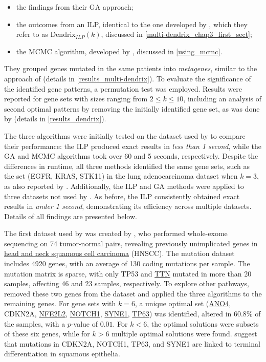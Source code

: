 \begin{itemize}
    \item the findings from their GA approach;
    \item the outcomes from an ILP, identical to the one developed by \textcite{multi-dendrix}, which they refer to as $\mathrm{Dendrix}_{\mathrm{\textit{ILP}}}(k)$, discussed in \cref{multi-dendrix_chap3_first_sect};
    \item the MCMC algorithm, developed by \textcite{dendrix}, discussed in \cref{using_mcmc}.
\end{itemize}

They grouped genes mutated in the same patients into \textit{metagenes}, similar to the approach of \textcite{multi-dendrix} (details in \cref{results_multi-dendrix}). To evaluate the significance of the identified gene patterns, a permutation test was employed. Results were reported for gene sets with sizes ranging from $2 \le k \le 10$, including an analysis of second optimal patterns by removing the initially identified gene set, as was done by \textcite{dendrix} (details in \cref{results_dendrix}).

The three algorithms were initially tested on the dataset used by \textcite{dendrix} to compare their performance: the ILP produced exact results in \textit{less than 1 second}, while the GA and MCMC algorithms took over 60 and 5 seconds, respectively. Despite the differences in runtime, all three methods identified the same gene sets, such as the set (EGFR, KRAS, STK11) in the lung adenocarcinoma dataset when $k = 3$, as also reported by \textcite{dendrix}. Additionally, the ILP and GA methods were applied to three datasets not used by \textcite{dendrix}. As before, the ILP consistently obtained exact results in \textit{under 1 second}, demonstrating its efficiency across multiple datasets. Details of all findings are presented below.

The first dataset used by \textcite{mdpfinder} was created by \textcite{stransky}, who performed whole-exome sequencing on 74 tumor-normal pairs, revealing previously unimplicated genes in \href{https://en.wikipedia.org/wiki/Head_and_neck_cancer}{head and neck squamous cell carcinoma} (HNSCC). The mutation dataset includes 4920 genes, with an average of 130 coding mutations per sample. The mutation matrix is sparse, with only TP53 and \href{https://www.ncbi.nlm.nih.gov/gene/7273}{TTN} mutated in more than 20 samples, affecting 46 and 23 samples, respectively. To explore other pathways, \textcite{mdpfinder} removed these two genes from the dataset and applied the three algorithms to the remaining genes. For gene sets with $k = 6$, a unique optimal set (\href{https://www.ncbi.nlm.nih.gov/gene/121601}{ANO4}, CDKN2A, \href{https://www.ncbi.nlm.nih.gov/gene/4780}{NFE2L2}, \href{https://www.ncbi.nlm.nih.gov/gene/4851}{NOTCH1}, \href{https://www.ncbi.nlm.nih.gov/gene/23345}{SYNE1}, \href{https://www.ncbi.nlm.nih.gov/gene/8626}{TP63}) was identified, altered in 60.8\% of the samples, with a $p$-value of $0.01$. For $k < 6$, the optimal solutions were subsets of these six genes, while for $k > 6$ multiple optimal solutions were found. \textcite{mdpfinder} suggest that mutations in CDKN2A, NOTCH1, TP63, and SYNE1 are linked to terminal differentiation in squamous epithelia.


